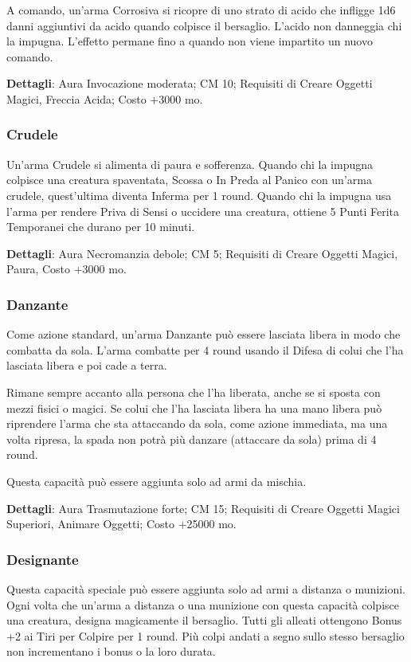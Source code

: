 \begin{multicols}{2}
A comando, un'arma Corrosiva si ricopre di uno strato di acido che infligge 1d6 danni aggiuntivi da acido quando colpisce il bersaglio. L'acido non danneggia chi la impugna. L'effetto permane fino a quando non viene impartito un nuovo comando.

\textbf{Dettagli}: Aura Invocazione moderata; CM 10; Requisiti di Creare Oggetti Magici, Freccia Acida; Costo +3000 mo.


\subsubsection{Crudele}

Un'arma Crudele si alimenta di paura e sofferenza. Quando chi la impugna colpisce una creatura spaventata, Scossa o In Preda al Panico con un'arma crudele, quest'ultima diventa Inferma per 1 round. Quando chi la impugna usa l'arma per rendere Priva di Sensi o uccidere una creatura, ottiene 5 Punti Ferita Temporanei che durano per 10 minuti.

\textbf{Dettagli}: Aura Necromanzia debole; CM 5; Requisiti di Creare Oggetti Magici, Paura, Costo +3000 mo.

\subsubsection{Danzante}

Come azione standard, un'arma Danzante può essere lasciata libera in modo che combatta da sola. L'arma combatte per 4 round usando il Difesa di colui che l'ha lasciata libera e poi cade a terra. 

Rimane sempre accanto alla persona che l'ha liberata, anche se si sposta con mezzi fisici o magici. Se colui che l'ha lasciata libera ha una mano libera può riprendere l'arma che sta attaccando da sola, come azione immediata, ma una volta ripresa, la spada non potrà più danzare (attaccare da sola) prima di 4 round.

Questa capacità può essere aggiunta solo ad armi da mischia.

\textbf{Dettagli}: Aura Trasmutazione forte; CM 15; Requisiti di Creare Oggetti Magici Superiori, Animare Oggetti; Costo +25000 mo.

\subsubsection{Designante}

Questa capacità speciale può essere aggiunta solo ad armi a distanza o munizioni. Ogni volta che un'arma a distanza o una munizione con questa capacità colpisce una creatura, designa magicamente il bersaglio. Tutti gli alleati ottengono Bonus +2 ai Tiri per Colpire per 1 round. Più colpi andati a segno sullo stesso bersaglio non incrementano i bonus o la loro durata.


\end{multicols}
